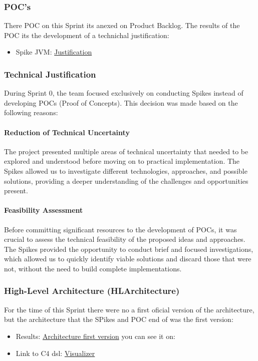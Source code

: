 \subsubsection{POC's}
There POC on this Sprint its anexed on Product Backlog.
The results of the POC its the development of a technichal justification:
\begin{itemize}    
    \item Spike JVM: \href{https://docs.google.com/document/d/1OWdCxe9lFPcMpADiyAyRCWGAioo0fwIuzMuRER24MHM/edit#heading=h.ql4vc1ru9w5i}{Justification}
\end{itemize}


\subsubsection{Technical Justification}

During Sprint 0, the team focused exclusively on conducting Spikes instead of developing POCs (Proof of Concepts). This decision was made based on the following reasons:

\paragraph{Reduction of Technical Uncertainty}
The project presented multiple areas of technical uncertainty that needed to be explored and understood before moving on to practical implementation. The Spikes allowed us to investigate different technologies, approaches, and possible solutions, providing a deeper understanding of the challenges and opportunities present.

\paragraph{Feasibility Assessment}
Before committing significant resources to the development of POCs, it was crucial to assess the technical feasibility of the proposed ideas and approaches. The Spikes provided the opportunity to conduct brief and focused investigations, which allowed us to quickly identify viable solutions and discard those that were not, without the need to build complete implementations.


\subsubsection{High-Level Architecture (HLArchitecture)}
For the time of this Sprint there were no a first oficial version of the architecture, but the architecture that the SPikes and POC end of was the first version:
\begin{itemize}
\item Results: \href{https://github.com/Pending-Name-21/arquitecture/pull/1/files}{Architecture first version}
you can see it on: 
\item Link to C4 dsl: \href{https://structurizr.com/dsl}{Visualizer}
\end{itemize}
\newpage
